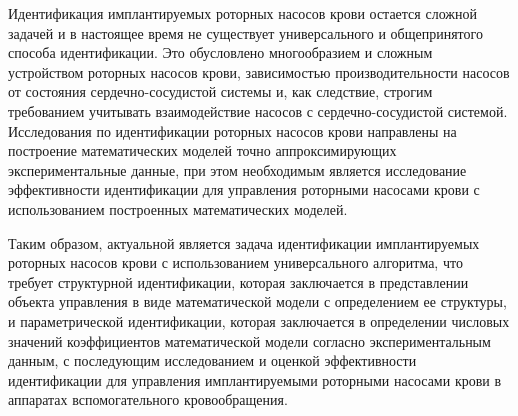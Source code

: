 
Идентификация имплантируемых роторных насосов крови остается сложной задачей и в настоящее время не существует универсального и общепринятого способа идентификации. Это обусловлено многообразием и сложным устройством роторных насосов крови, зависимостью производительности насосов от состояния сердечно-сосудистой системы и, как следствие, строгим требованием учитывать взаимодействие насосов с сердечно-сосудистой системой. Исследования по идентификации роторных насосов крови направлены на построение математических моделей точно аппроксимирующих экспериментальные данные, при этом необходимым является исследование эффективности идентификации для управления роторными насосами крови с использованием построенных математических моделей.


Таким образом, актуальной является задача идентификации имплантируемых роторных насосов крови с использованием универсального алгоритма, что требует структурной идентификации, которая заключается в представлении объекта управления в виде математической модели с определением ее структуры, и параметрической идентификации, которая заключается в определении числовых значений коэффициентов математической модели согласно экспериментальным данным, с последующим исследованием и оценкой эффективности идентификации для управления имплантируемыми роторными насосами крови в аппаратах вспомогательного кровообращения.


